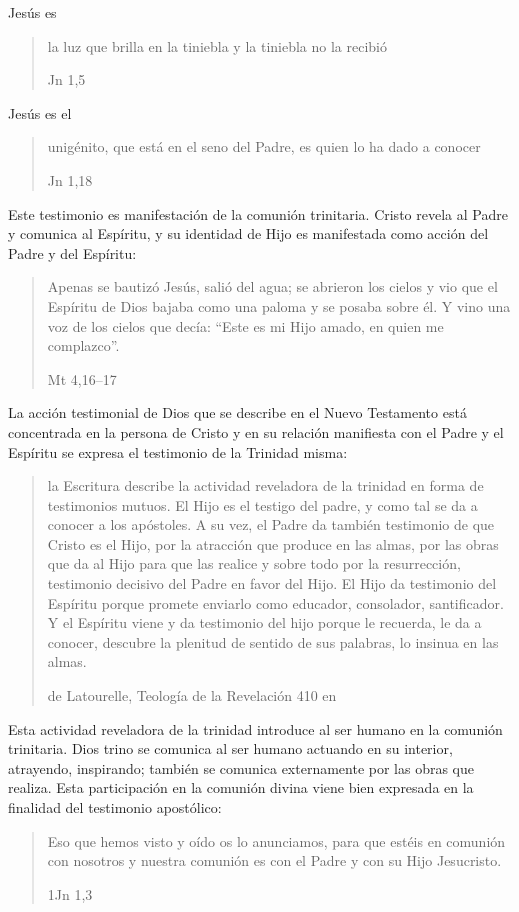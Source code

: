 Jesús es \blockquote[Jn 1,5]{la luz que brilla en la tiniebla y la tiniebla no
  la recibió}. Jesús es el \blockquote[Jn 1,18]{unigénito, que está en el seno
  del Padre, es quien lo ha dado a conocer}. Este testimonio es manifestación de
la comunión trinitaria. Cristo revela al Padre y comunica al Espíritu, y su
identidad de Hijo es manifestada como acción del Padre y del Espíritu:
\blockquote[Mt 4,16--17]{Apenas se bautizó Jesús, salió del agua; se abrieron
  los cielos y vio que el Espíritu de Dios bajaba como una paloma y se posaba
  sobre él. Y vino una voz de los cielos que decía: \enquote{Este es mi Hijo
    amado, en quien me complazco}.}

La acción testimonial de Dios que se describe en el Nuevo Testamento está
concentrada en la persona de Cristo y en su relación manifiesta con el Padre y
el Espíritu se expresa el testimonio de la Trinidad misma:
\blockquote[de Latourelle, Teología de la Revelación 410 en
{\cite[131]{prades2015testimonio}}]{la Escritura describe la actividad
  reveladora de la trinidad en forma de testimonios mutuos. El Hijo es el
  testigo del padre, y como tal se da a conocer a los apóstoles. A su vez, el
  Padre da también testimonio de que Cristo es el Hijo, por la atracción que
  produce en las almas, por las obras que da al Hijo para que las realice y
  sobre todo por la resurrección, testimonio decisivo del Padre en favor del
  Hijo. El Hijo da testimonio del Espíritu porque promete enviarlo como
  educador, consolador, santificador. Y el Espíritu viene y da testimonio del
  hijo porque le recuerda, le da a conocer, descubre la plenitud de sentido de
  sus palabras, lo insinua en las almas.}
Esta actividad reveladora de la trinidad introduce al ser humano en la comunión
trinitaria. Dios trino se comunica al ser humano actuando en su interior,
atrayendo, inspirando; también se comunica externamente por las obras que
realiza. Esta participación en la comunión divina viene bien expresada en la
finalidad del testimonio apostólico:
\blockquote[1Jn 1,3]{Eso que hemos visto y oído os lo anunciamos, para que
  estéis en comunión con nosotros y nuestra comunión es con el Padre y con su
  Hijo Jesucristo.}

